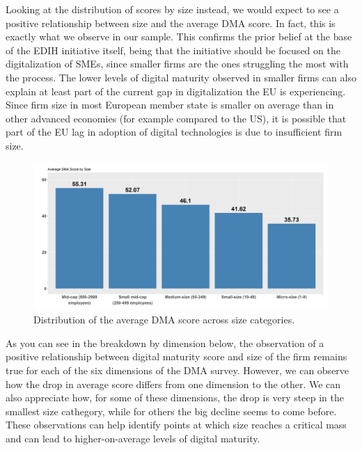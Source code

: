 \documentclass[12pt]{report}
\begin{document}
\par Looking at the distribution of scores by size instead, we would expect to see a positive relationship between size and the average DMA score. In fact, this is exactly what we observe in our sample. This confirms the prior belief at the base of the EDIH initiative itself, being that the initiative should be focused on the digitalization of SMEs, since smaller firms are the ones struggling the most with the process. The lower levels of digital maturity observed in smaller firms can also explain at least part of the current gap in digitalization the EU is experiencing. Since firm size in most European member state is smaller on average than in other advanced economies (for example compared to the US), it is possible that part of the EU lag in adoption of digital technologies is due to insufficient firm size.
 

\begin{figure}[h!]
    \centering
    \includegraphics[width=0.6\textheight]{../Output/avg_dmascore_by_size.png}
    \caption{Distribution of the average DMA score across size categories.}
    \label{fig:dma_size_chart}
\end{figure}

\par As you can see in the breakdown by dimension below, the observation of a positive relationship between digital maturity score and size of the firm remains true for each of the six dimensions of the DMA survey. However, we can observe how the drop in average score differs from one dimension to the other. We can also appreciate how, for some of these dimensions, the drop is very steep in the smallest size cathegory, while for others the big decline seems to come before. These observations can help identify points at which size reaches a critical mass and can lead to higher-on-average levels of digital maturity. 
\end{document}
